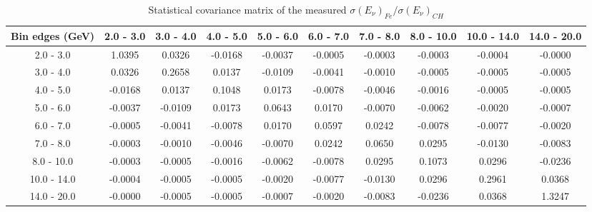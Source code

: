 \documentclass[aps,prl,twocolumn,superscriptaddress,nofootinbib]{revtex4-1}
\begin{document}
\begin{table}[h!]
  \centering
  \caption{Statistical covariance matrix of the measured $\sigma(E_{\nu})_{Fe}/\sigma(E_{\nu})_{CH}$}
    \begin{tabular}{c||ccccccccc}
      Bin edges (GeV) & 2.0 - 3.0 & 3.0 - 4.0 & 4.0 - 5.0 & 5.0 - 6.0 & 6.0 - 7.0 & 7.0 - 8.0 & 8.0 - 10.0 & 10.0 - 14.0 & 14.0 - 20.0 \\
\hline \hline
        2.0 - 3.0 &  1.0395 &  0.0326 & -0.0168 & -0.0037 & -0.0005 & -0.0003 & -0.0003 & -0.0004 & -0.0000 \\
        3.0 - 4.0 &  0.0326 &  0.2658 &  0.0137 & -0.0109 & -0.0041 & -0.0010 & -0.0005 & -0.0005 & -0.0005 \\
        4.0 - 5.0 & -0.0168 &  0.0137 &  0.1048 &  0.0173 & -0.0078 & -0.0046 & -0.0016 & -0.0005 & -0.0005 \\
        5.0 - 6.0 & -0.0037 & -0.0109 &  0.0173 &  0.0643 &  0.0170 & -0.0070 & -0.0062 & -0.0020 & -0.0007 \\
        6.0 - 7.0 & -0.0005 & -0.0041 & -0.0078 &  0.0170 &  0.0597 &  0.0242 & -0.0078 & -0.0077 & -0.0020 \\
        7.0 - 8.0 & -0.0003 & -0.0010 & -0.0046 & -0.0070 &  0.0242 &  0.0650 &  0.0295 & -0.0130 & -0.0083 \\
       8.0 - 10.0 & -0.0003 & -0.0005 & -0.0016 & -0.0062 & -0.0078 &  0.0295 &  0.1073 &  0.0296 & -0.0236 \\
      10.0 - 14.0 & -0.0004 & -0.0005 & -0.0005 & -0.0020 & -0.0077 & -0.0130 &  0.0296 &  0.2961 &  0.0368 \\
      14.0 - 20.0 & -0.0000 & -0.0005 & -0.0005 & -0.0007 & -0.0020 & -0.0083 & -0.0236 &  0.0368 &  1.3247 \\
    \end{tabular}
  \label{tablecov:Fe_Statistical_Enu}
\end{table}
\end{document}
